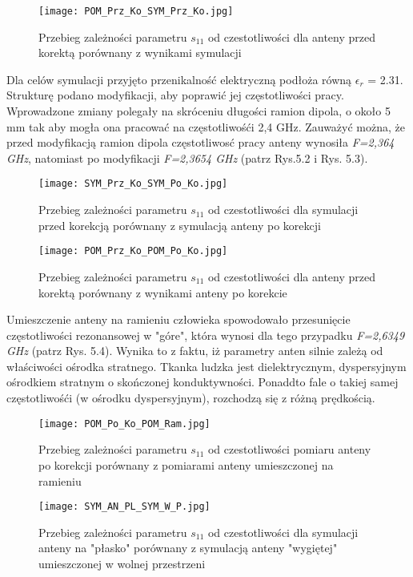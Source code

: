 \begin{figure}[h!]
\centering
	\texttt{[image: POM\_Prz\_Ko\_SYM\_Prz\_Ko.jpg]}
	\caption{Przebieg zależności parametru $s_{11}$ od czestotliwości dla anteny przed korektą porównany z wynikami symulacji}
\end{figure}


\newpage
\noindent
\newline Dla celów symulacji przyjęto przenikalność elektryczną podłoża równą $\epsilon_{r}$ = 2.31. Strukturę podano modyfikacji, aby poprawić jej częstotliwości pracy. Wprowadzone zmiany polegały na skróceniu długości ramion dipola, o około 5 mm tak aby mogła ona pracować na częstotliwośći 2,4 GHz. Zauważyć można, że przed modyfikacją ramion dipola częstotliwosć pracy anteny wynosiła \emph{F=2,364 GHz}, natomiast po modyfikacji \emph{F=2,3654 GHz} (patrz Rys.5.2 i Rys. 5.3).  

\begin{figure}[H]
\centering
	\texttt{[image: SYM\_Prz\_Ko\_SYM\_Po\_Ko.jpg]}
	\caption{Przebieg zależności parametru $s_{11}$ od czestotliwości dla symulacji przed korekcją porównany z symulacją anteny po korekcji}
\end{figure}

\newpage
\begin{figure}[H]
\centering
	\texttt{[image: POM\_Prz\_Ko\_POM\_Po\_Ko.jpg]}
	\caption{Przebieg zależności parametru $s_{11}$ od czestotliwości dla anteny przed korektą porównany z wynikami anteny po korekcie}
\end{figure}


\newpage
\noindent
\newline Umieszczenie anteny na ramieniu człowieka spowodowało przesunięcie częstotliwości rezonansowej w "góre", która wynosi dla tego przypadku \emph{F=2,6349 GHz} (patrz Rys. 5.4). Wynika to z faktu, iż parametry anten silnie zależą od właściwości ośrodka stratnego.  
Tkanka ludzka jest dielektrycznym, dyspersyjnym ośrodkiem stratnym o skończonej konduktywności. Ponaddto fale o takiej samej częstotliwośći (w ośrodku dyspersyjnym), rozchodzą się z różną prędkością. 


\begin{figure}[H]
\centering
	\texttt{[image: POM\_Po\_Ko\_POM\_Ram.jpg]}
	\caption{Przebieg zależności parametru $s_{11}$ od czestotliwości pomiaru anteny po korekcji porównany z pomiarami anteny umieszczonej na ramieniu}
\end{figure}


\newpage
\begin{figure}[H]
\centering
	\texttt{[image: SYM\_AN\_PL\_SYM\_W\_P.jpg]}
	\caption{Przebieg zależności parametru $s_{11}$ od czestotliwości dla symulacji anteny na "płasko" porównany z symulacją anteny "wygiętej" umieszczonej w wolnej przestrzeni}
\end{figure}


